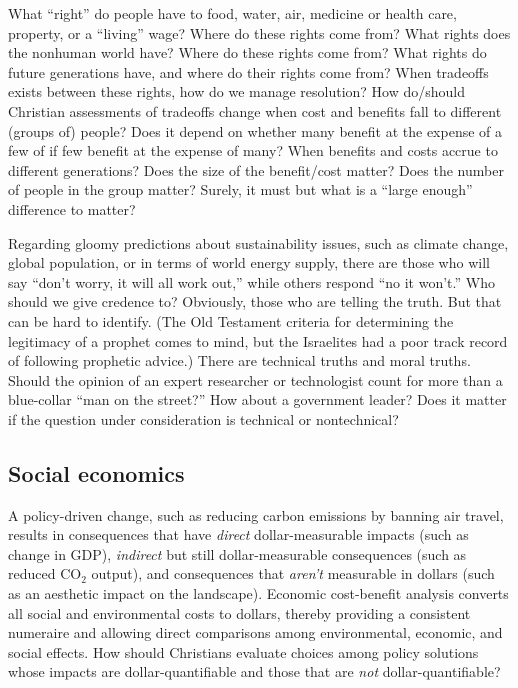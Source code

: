 \documentclass[12pt]{article}
\begin{document}
What ``right'' do people have to food, water, air, medicine or health care, property, or a ``living'' wage? 
Where do these rights come from? What rights does the nonhuman world have? Where do these rights come from?
What rights do future generations have, and where do their rights come from? %
When tradeoffs exists between these rights, how do we manage resolution?
How do/should Christian assessments of tradeoffs change when cost and benefits fall to different (groups of) people?
Does it depend on whether many benefit at the expense of a few of if few benefit at the expense of many? 
When benefits and costs accrue to different generations? 
Does the size of the benefit/cost matter? 
Does the number of people in the group matter? Surely, it must but what is a ``large enough'' difference to matter?

Regarding gloomy predictions about sustainability issues, such as climate change, global population,
or in terms of world energy supply, there are those who will say ``don't worry, it will all work out,'' while
others respond ``no it won't.'' Who should we give credence to? Obviously, those who are telling the truth. But that can
be hard to identify. (The Old Testament criteria for determining the legitimacy of a prophet comes to mind, but the
Israelites had a poor track record of following prophetic advice.) There are technical truths and moral truths. Should
the opinion of an expert researcher or technologist count for more than a blue-collar ``man on the street?'' How about a
government leader? Does it matter if the question under consideration is technical or nontechnical?

\subsection{Social economics}

A policy-driven change, such as reducing carbon emissions by banning air travel, results in consequences that have
\emph{direct} dollar-measurable impacts (such as change in GDP), \emph{indirect} but still dollar-measurable
consequences (such as reduced CO$_2$ output), and consequences that \emph{aren't} measurable in dollars (such as an
aesthetic impact on the landscape). Economic cost-benefit analysis converts all social and environmental costs to
dollars, thereby providing a consistent numeraire and allowing direct comparisons among environmental, economic, and
social effects. How should Christians evaluate choices among policy solutions whose impacts are dollar-quantifiable and
those that are \emph{not} dollar-quantifiable? 
\end{document}
